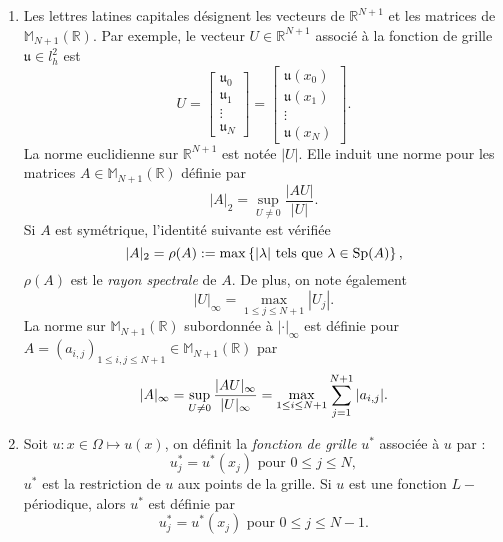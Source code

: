 \begin{enumerate}
\item Les lettres latines capitales désignent les vecteurs de $\mathbb{R}^{N+1}$ et les matrices de $\mathbb{M}_{N+1}(\mathbb{R})$. Par exemple, le vecteur $U \in \mathbb{R}^{N+1}$ associé à la fonction de grille $\mathfrak{u} \in l^2_h$ est
\begin{equation}
U = \begin{bmatrix}
\mathfrak{u}_0 \\ \mathfrak{u}_1 \\ \vdots \\ \mathfrak{u}_N
\end{bmatrix} =
\begin{bmatrix}
\mathfrak{u}(x_0) \\ \mathfrak{u}(x_1) \\ \vdots \\ \mathfrak{u}(x_N)
\end{bmatrix}.
\end{equation}
La norme euclidienne sur $\mathbb{R}^{N+1}$ est notée $|U|$. Elle induit une norme pour les matrices $A \in \mathbb{M}_{N+1}(\mathbb{R})$ définie par
\begin{equation}
|A|_2 = \sup_{U \neq 0} \dfrac{|AU|}{|U|}.
\end{equation}
Si $A$ est symétrique, l'identité suivante est vérifiée
\begin{equation}
|A|_2 = \rho(A) := \max \left\lbrace |\lambda| \text{ tels que } \lambda \in \text{Sp} (A) \right\rbrace,
\end{equation}
$\rho(A)$ est le \textit{rayon spectrale} de $A$.
De plus, on note également
\begin{equation}
|U|_{\infty} = \max_{1 \leq j \leq N+1} |U_j|.
\end{equation}
La norme sur $\mathbb{M}_{N+1}(\mathbb{R})$ subordonnée à $|\cdot|_{\infty}$ est définie pour $A=(a_{i,j})_{1 \leq i,j \leq N+1} \in \mathbb{M}_{N+1}(\mathbb{R})$ par
\begin{equation}
|A|_{\infty} = \sup_{U \neq 0} \dfrac{|AU|_{\infty}}{|U|_{\infty}} = \max_{1 \leq i \leq N+1} \displaystyle\sum\limits_{j=1}^{N+1} |a_{i,j}|.
\end{equation}



\item Soit $u: x \in \Omega \mapsto u(x)$, on définit la \textit{fonction de grille} $u^*$ associée à $u$ par :
\begin{equation}
u^*_j = u^*(x_j) \text{ pour } 0 \leq j \leq N,
\end{equation}
$u^*$ est la restriction de $u$ aux points de la grille. Si $u$ est une fonction $L-$périodique, alors $u^*$ est définie par
\begin{equation}
u^*_j = u^*(x_j) \text{ pour } 0 \leq j \leq N-1.
\end{equation}
\end{enumerate}

